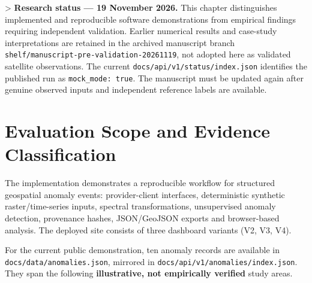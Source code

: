 
> \textbf{Research status — 19 November 2026.} This chapter distinguishes implemented and reproducible software demonstrations from empirical findings requiring independent validation. Earlier numerical results and case-study interpretations are retained in the archived manuscript branch \texttt{shelf/manuscript-pre-validation-20261119}, not adopted here as validated satellite observations. The current \texttt{docs/api/v1/status/index.json} identifies the published run as \texttt{mock\_mode: true}. The manuscript must be updated again after genuine observed inputs and independent reference labels are available.

\section{Evaluation Scope and Evidence Classification}

The implementation demonstrates a reproducible workflow for structured geospatial anomaly events: provider-client interfaces, deterministic synthetic raster/time-series inputs, spectral transformations, unsupervised anomaly detection, provenance hashes, JSON/GeoJSON exports and browser-based analysis. The deployed site consists of three dashboard variants (V2, V3, V4).

For the current public demonstration, ten anomaly records are available in \texttt{docs/data/anomalies.json}, mirrored in \texttt{docs/api/v1/anomalies/index.json}. They span the following \textbf{illustrative, not empirically verified} study areas.

